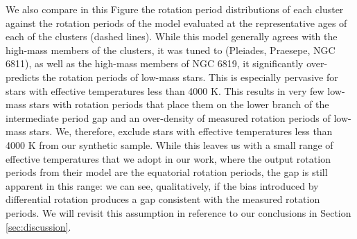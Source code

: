 We also compare in this Figure the rotation period distributions of each cluster against the rotation periods of the \citet{spada_competing_2020} model evaluated at the representative ages of each of the clusters (dashed lines).
While this model generally agrees with the high-mass members of the clusters, it was tuned to (Pleiades, Praesepe, NGC 6811), as well as the high-mass members of NGC 6819, it significantly over-predicts the rotation periods of low-mass stars.
This is especially pervasive for stars with effective temperatures less than 4000 K.
This results in very few low-mass stars with rotation periods that place them on the lower branch of the intermediate period gap and an over-density of measured rotation periods of low-mass stars.
We, therefore, exclude stars with effective temperatures less than 4000 K from our synthetic sample. 
While this leaves us with a small range of effective temperatures that we adopt in our work, where the output rotation periods from their model are the equatorial rotation periods, the gap is still apparent in this range: we can see, qualitatively, if the bias introduced by differential rotation produces a gap consistent with the measured rotation periods.
We will revisit this assumption in reference to our conclusions in Section \ref{sec:discussion}.

